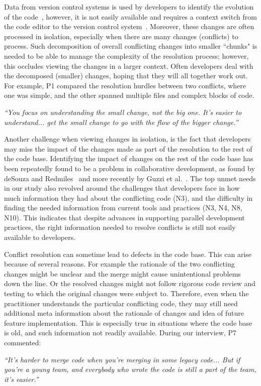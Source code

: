 Data from version control systems is used by developers to identify the evolution of the code~\cite{Mihai_lenses}, however, it is not easily available and requires a context switch from the code editor to the version control system~\cite{Guzzi2015}. 
Moreover, these changes are often processed in isolation, especially when there are many changes (conflicts) to process. 
Such decomposition of overall conflicting changes into smaller ``chunks" is needed to be able to manage the complexity of the resolution process; however, this occludes viewing the changes in a larger context. 
Often developers deal with the decomposed (smaller) changes, hoping that they will all together work out. 
For example, P1 compared the resolution hurdles between two conflicts, where one was simple, and the other spanned multiple files and complex blocks of code.
\begin{quoting}
\textit{``You focus on understanding the small change, not the big one. It's easier to understand... get the small change to go with the flow of the bigger change.''}
\end{quoting}

Another challenge when viewing changes in isolation, is the fact that developers may miss the impact of the changes made as part of the resolution to the rest of the code base. 
Identifying the impact of changes on the rest of the code base has been repeatedly found to be a problem in collaborative development, as found by deSouza and Redmiles~\cite{deSouza2008} and more recently by Guzzi et al.~\cite{Guzzi2015}. 
The top unmet needs in our study also revolved around the challenges that developers face in how much information they had about the conflicting code (N3), and the difficulty in finding the needed information from current tools and practices (N3, N4, N8, N10). 
This indicates that despite advances in supporting parallel development practices, the right information needed to resolve conflicts is still not easily available to developers. 

Conflict resolution can sometime lead to defects in the code base. This can arise because of several reasons. For example the rationale of the two conflicting changes might be unclear and the merge might cause unintentional problems down the line. Or the resolved changes might not follow rigorous code review and testing to which the original changes were subject to.
Therefore, even when the practitioner understands the particular conflicting code, they may still need additional meta information about the rationale of changes and idea of future feature implementation. This is especially true in situations where the code base is old, and such information not readily available. During our interview, P7 commented:
\begin{quoting}
\textit{``It's harder to merge code when you're merging in some legacy code... But if you're a young team, and everybody who wrote the code is still a part of the team, it's easier.''}
\end{quoting}

